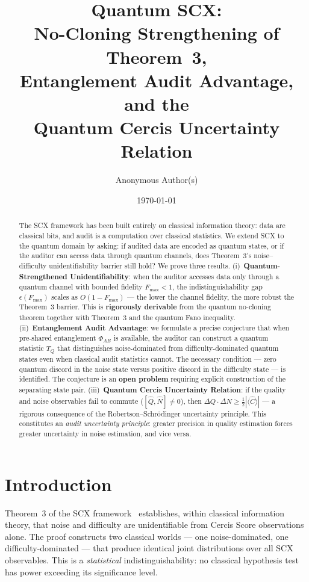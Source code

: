 \documentclass[12pt,a4paper]{article}
\title{\bfseries Quantum SCX:\\
No-Cloning Strengthening of Theorem~3,\\
Entanglement Audit Advantage, and the\\
Quantum Cercis Uncertainty Relation}
\author{Anonymous Author(s)}
\date{\today}
\begin{document}
\maketitle

\begin{abstract}
The SCX framework has been built entirely on classical information theory:
data are classical bits, and audit is a computation over classical statistics.
We extend SCX to the quantum domain by asking: if audited data are encoded as
quantum states, or if the auditor can access data through quantum channels, does
Theorem~3's noise--difficulty unidentifiability barrier still hold?  We prove
three results.  (i)~\textbf{Quantum-Strengthened Unidentifiability}: when the
auditor accesses data only through a quantum channel with bounded fidelity
$F_{\max}<1$, the indistinguishability gap $\epsilon(F_{\max})$ scales as
$O(1-F_{\max})$ — the lower the channel fidelity, the more robust the Theorem~3
barrier.  This is \textbf{rigorously derivable} from the quantum no-cloning
theorem together with Theorem~3 and the quantum Fano inequality.
(ii)~\textbf{Entanglement Audit Advantage}: we formulate a precise conjecture
that when pre-shared entanglement $\Phi_{AB}$ is available, the auditor can
construct a quantum statistic $T_Q$ that distinguishes noise-dominated from
difficulty-dominated quantum states even when classical audit statistics
cannot.  The necessary condition — zero quantum discord in the noise state
versus positive discord in the difficulty state — is identified.  The conjecture
is an \textbf{open problem} requiring explicit construction of the separating
state pair.  (iii)~\textbf{Quantum Cercis Uncertainty Relation}: if the quality
and noise observables fail to commute ($[\hat{Q},\hat{N}]\neq0$), then
$\Delta Q\cdot\Delta N \geq \frac12|\langle\hat{C}\rangle|$ — a rigorous
consequence of the Robertson--Schr\"odinger uncertainty principle.  This
constitutes an \textit{audit uncertainty principle}: greater precision in
quality estimation forces greater uncertainty in noise estimation, and vice
versa.
\end{abstract}

\section{Introduction}

Theorem~3 of the SCX framework~\citep{scx2024cercis} establishes, within
classical information theory, that noise and difficulty are unidentifiable from
Cercis Score observations alone.  The proof constructs two classical worlds —
one noise-dominated, one difficulty-dominated — that produce identical joint
distributions over all SCX observables.  This is a \emph{statistical}
indistinguishability: no classical hypothesis test has power exceeding its
significance level.
\end{document}
